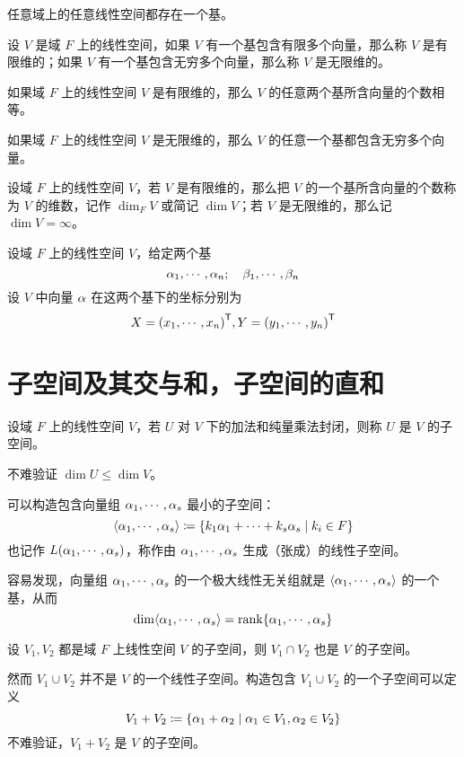 \begin{theorem}
    任意域上的任意线性空间都存在一个基。
\end{theorem}

\begin{definition}
    设 $V$ 是域 $F$ 上的线性空间，如果 $V$ 有一个基包含有限多个向量，那么称 $V$ 是有限维的；如果 $V$ 有一个基包含无穷多个向量，那么称 $V$ 是无限维的。
\end{definition}

如果域 $F$ 上的线性空间 $V$ 是有限维的，那么 $V$ 的任意两个基所含向量的个数相等。

如果域 $F$ 上的线性空间 $V$ 是无限维的，那么 $V$ 的任意一个基都包含无穷多个向量。

\begin{definition}
    设域 $F$ 上的线性空间 $V$，若 $V$ 是有限维的，那么把 $V$ 的一个基所含向量的个数称为 $V$ 的维数，记作 $\dim_{F} V$ 或简记 $\dim V$；若 $V$ 是无限维的，那么记 $\dim V = \infty$。
\end{definition}

设域 $F$ 上的线性空间 $V$，给定两个基
\[ \alpha_1,\cdots,\alpha_n; \quad \beta_1,\cdots,\beta_n \]
设 $V$ 中向量 $\alpha$ 在这两个基下的坐标分别为
\[ X = {(x_1,\cdots,x_n)}^\mathsf{T}, Y = {(y_1,\cdots,y_n)}^\mathsf{T} \]

\section{子空间及其交与和，子空间的直和}

设域 $F$ 上的线性空间 $V$，若 $U$ 对 $V$ 下的加法和纯量乘法封闭，则称 $U$ 是 $V$ 的子空间。

不难验证 $\dim U \leqslant \dim V$。

可以构造包含向量组 $\alpha_1,\cdots,\alpha_s$ 最小的子空间：
\[ \langle \alpha_1,\cdots,\alpha_s \rangle \coloneqq \{ k_1\alpha_1+\cdots+k_s\alpha_s \mid k_i\in F \} \]
也记作 $L(\alpha_1,\cdots,\alpha_s)$，称作由 $\alpha_1,\cdots,\alpha_s$ 生成（张成）的线性子空间。

容易发现，向量组 $\alpha_1,\cdots,\alpha_s$ 的一个极大线性无关组就是 $\langle \alpha_1,\cdots,\alpha_s \rangle$ 的一个基，从而
\[ \dim \langle \alpha_1,\cdots,\alpha_s \rangle = \operatorname{rank} \{ \alpha_1,\cdots,\alpha_s \}\]

\begin{theorem}
    设 $V_1,V_2$ 都是域 $F$ 上线性空间 $V$ 的子空间，则 $V_1 \cap V_2$ 也是 $V$ 的子空间。
\end{theorem}

然而 $V_1 \cup V_2$ 并不是 $V$ 的一个线性子空间。构造包含 $V_1 \cup V_2$ 的一个子空间可以定义
\[ V_1+V_2 \coloneqq \{ \alpha_1+\alpha_2 \mid \alpha_1\in V_1, \alpha_2\in V_2 \} \]
不难验证，$V_1+V_2$ 是 $V$ 的子空间。

